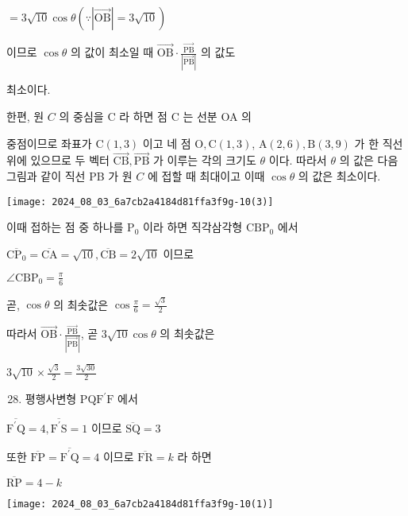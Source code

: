 \documentclass[10pt]{article}
\begin{document}
\(=3 \sqrt{10} \cos \theta(\because|\overrightarrow{\mathrm{OB}}|=3 \sqrt{10})\)

이므로 \(\cos \theta\) 의 값이 최소일 때 \(\overrightarrow{\mathrm{OB}} \cdot \frac{\overrightarrow{\mathrm{PB}}}{|\overrightarrow{\mathrm{PB}}|}\) 의 값도

최소이다.

한편, 원 \(C\) 의 중심을 C 라 하면 점 C 는 선분 OA 의

중점이므로 좌표가 \(\mathrm{C}(1,3)\) 이고 네 점 \(\mathrm{O}, \mathrm{C}(1,3)\), \(\mathrm{A}(2,6), \mathrm{B}(3,9)\) 가 한 직선 위에 있으므로 두 벡터 \(\overrightarrow{\mathrm{CB}}, \overrightarrow{\mathrm{PB}}\) 가 이루는 각의 크기도 \(\theta\) 이다. 따라서 \(\theta\) 의 값은 다음 그림과 같이 직선 PB 가 원 \(C\) 에 접할 때 최대이고 이때 \(\cos \theta\) 의 값은 최소이다.

\begin{center}
\texttt{[image: 2024\_08\_03\_6a7cb2a4184d81ffa3f9g-10(3)]}
\end{center}

이때 접하는 점 중 하나를 \(\mathrm{P}_{0}\) 이라 하면 직각삼각형 \(\mathrm{CBP}_{0}\) 에서

\(\overline{\mathrm{CP}_{0}}=\overline{\mathrm{CA}}=\sqrt{10}, \overline{\mathrm{CB}}=2 \sqrt{10}\) 이므로

\(\angle \mathrm{CBP}_{0}=\frac{\pi}{6}\)

곧, \(\cos \theta\) 의 최솟값은 \(\cos \frac{\pi}{6}=\frac{\sqrt{3}}{2}\)

따라서 \(\overrightarrow{\mathrm{OB}} \cdot \frac{\overrightarrow{\mathrm{PB}}}{|\overrightarrow{\mathrm{PB}}|}\), 곧 \(3 \sqrt{10} \cos \theta\) 의 최솟값은

\(3 \sqrt{10} \times \frac{\sqrt{3}}{2}=\frac{3 \sqrt{30}}{2}\)

\begin{enumerate}
  \setcounter{enumi}{27}
  \item 평행사변형 \(\mathrm{PQF}^{\prime} \mathrm{F}\) 에서
\end{enumerate}

\(\overline{\mathrm{F}^{\prime} \mathrm{Q}}=4, \overline{\mathrm{F}^{\prime} \mathrm{S}}=1\) 이므로 \(\overline{\mathrm{SQ}}=3\)

또한 \(\overline{\mathrm{FP}}=\overline{\mathrm{F}^{\prime} \mathrm{Q}}=4\) 이므로 \(\overline{\mathrm{FR}}=k\) 라 하면

\(\overline{\mathrm{RP}}=4-k\)

\begin{center}
\texttt{[image: 2024\_08\_03\_6a7cb2a4184d81ffa3f9g-10(1)]}
\end{center}
\end{document}
